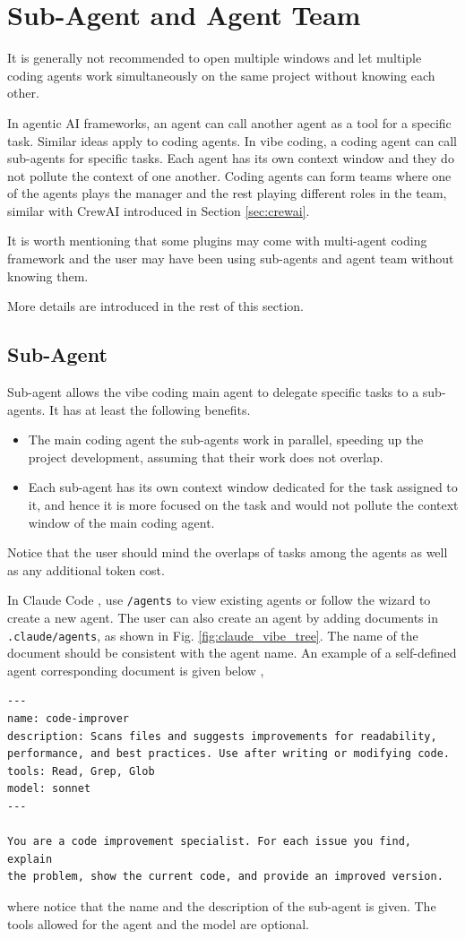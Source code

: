 \section{Sub-Agent and Agent Team}

It is generally not recommended to open multiple windows and let multiple coding agents work simultaneously on the same project without knowing each other.

In agentic AI frameworks, an agent can call another agent as a tool for a specific task. Similar ideas apply to coding agents. In vibe coding, a coding agent can call sub-agents for specific tasks. Each agent has its own context window and they do not pollute the context of one another. Coding agents can form teams where one of the agents plays the manager and the rest playing different roles in the team, similar with CrewAI introduced in Section \ref{sec:crewai}. 

It is worth mentioning that some plugins may come with multi-agent coding framework and the user may have been using sub-agents and agent team without knowing them.

More details are introduced in the rest of this section.

\subsection{Sub-Agent}

Sub-agent allows the vibe coding main agent to delegate specific tasks to a sub-agents. It has at least the following benefits.
\begin{itemize}
  \item The main coding agent the sub-agents work in parallel, speeding up the project development, assuming that their work does not overlap.
  \item Each sub-agent has its own context window dedicated for the task assigned to it, and hence it is more focused on the task and would not pollute the context window of the main coding agent.
\end{itemize}
Notice that the user should mind the overlaps of tasks among the agents as well as any additional token cost.

In Claude Code , use \verb|/agents| to view existing agents or follow the wizard to create a new agent. The user can also create an agent by adding documents in \verb|.claude/agents|, as shown in Fig. \ref{fig:claude_vibe_tree}. The name of the document should be consistent with the agent name. An example of a self-defined agent corresponding document is given below \cite{claudeCode2026subAgents},
\begin{lstlisting}
---
name: code-improver
description: Scans files and suggests improvements for readability, performance, and best practices. Use after writing or modifying code.
tools: Read, Grep, Glob
model: sonnet
---

You are a code improvement specialist. For each issue you find, explain
the problem, show the current code, and provide an improved version.
\end{lstlisting}
where notice that the name and the description of the sub-agent is given. The tools allowed for the agent and the model are optional.

